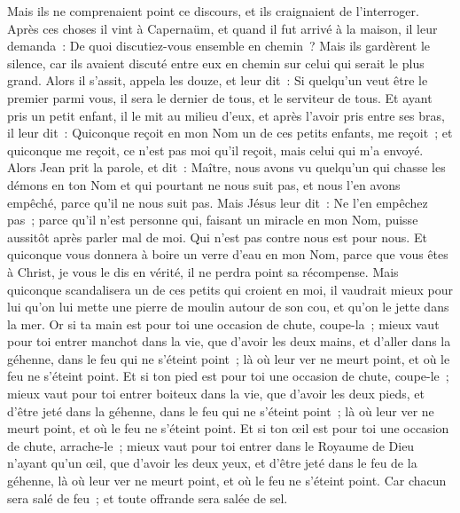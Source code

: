 \begin{multicols}{2}
Mais ils ne comprenaient point ce discours, et ils craignaient de l'interroger.
Après ces choses il vint à Capernaüm, et quand il fut arrivé à la maison, il leur demanda~: De quoi discutiez-vous ensemble en chemin~?
Mais ils gardèrent le silence, car ils avaient discuté entre eux en chemin sur celui qui serait le plus grand.
Alors il s'assit, appela les douze, et leur dit~: Si quelqu'un veut être le premier parmi vous, il sera le dernier de tous, et le serviteur de tous.
Et ayant pris un petit enfant, il le mit au milieu d'eux, et après l'avoir pris entre ses bras, il leur dit~:
Quiconque reçoit en mon Nom un de ces petits enfants, me reçoit~; et quiconque me reçoit, ce n'est pas moi qu'il reçoit, mais celui qui m'a envoyé.
Alors Jean prit la parole, et dit~: Maître, nous avons vu quelqu'un qui chasse les démons en ton Nom et qui pourtant ne nous suit pas, et nous l'en avons empêché, parce qu'il ne nous suit pas.
Mais Jésus leur dit~: Ne l'en empêchez pas~; parce qu'il n'est personne qui, faisant un miracle en mon Nom, puisse aussitôt après parler mal de moi.
Qui n'est pas contre nous est pour nous.
Et quiconque vous donnera à boire un verre d'eau en mon Nom, parce que vous êtes à Christ, je vous le dis en vérité, il ne perdra point sa récompense.
Mais quiconque scandalisera un de ces petits qui croient en moi, il vaudrait mieux pour lui qu'on lui mette une pierre de moulin autour de son cou, et qu'on le jette dans la mer.
Or si ta main est pour toi une occasion de chute, coupe-la~; mieux vaut pour toi entrer manchot dans la vie, que d'avoir les deux mains, et d'aller dans la géhenne, dans le feu qui ne s'éteint point~;
là où leur ver ne meurt point, et où le feu ne s'éteint point.
Et si ton pied est pour toi une occasion de chute, coupe-le~; mieux vaut pour toi entrer boiteux dans la vie, que d'avoir les deux pieds, et d'être jeté dans la géhenne, dans le feu qui ne s'éteint point~;
là où leur ver ne meurt point, et où le feu ne s'éteint point.
Et si ton œil est pour toi une occasion de chute, arrache-le~; mieux vaut pour toi entrer dans le Royaume de Dieu n'ayant qu'un œil, que d'avoir les deux yeux, et d'être jeté dans le feu de la géhenne,
là où leur ver ne meurt point, et où le feu ne s'éteint point.
Car chacun sera salé de feu~; et toute offrande sera salée de sel.

\end{multicols}
